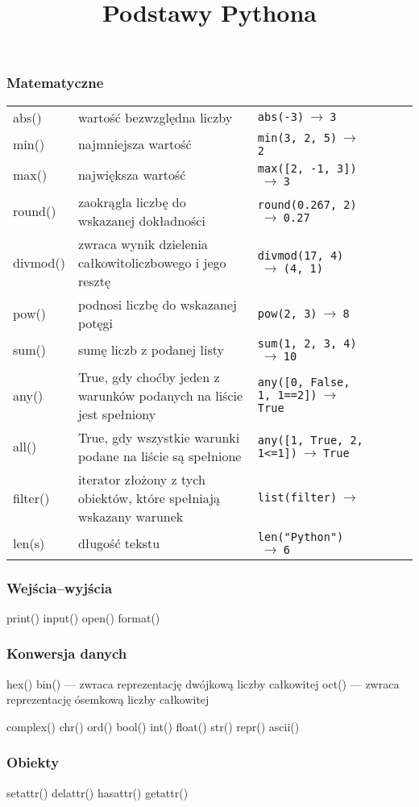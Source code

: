 \documentclass[a4paper]{article}
\title{Podstawy Pythona}
\begin{document}
\subsubsection*{Matematyczne}
\begin{tabularx}{\textwidth}{lp{}|lp{}|lp{}}
abs() & wartość bezwzględna liczby & \verb|abs(-3)|$\ \to\ $\verb|3|\\
min() & najmniejsza wartość & \verb|min(3, 2, 5)|$\ \to\ $\verb|2| \\
max() & największa wartość & \verb|max([2, -1, 3])|$\ \to\ $\verb|3|\\
round() & zaokrągla liczbę do wskazanej dokładności &  \verb|round(0.267, 2)|$\ \to\ $\verb|0.27|\\

divmod() & zwraca wynik dzielenia całkowitoliczbowego i jego resztę & \verb|divmod(17, 4)|$\ \to\ $\verb|(4, 1)|\\
pow() & podnosi liczbę do wskazanej potęgi & \verb|pow(2, 3)|$\ \to\ $\verb|8|\\
sum() & sumę liczb z podanej listy & \verb|sum(1, 2, 3, 4)|$\ \to\ $\verb|10|\\
any() & True, gdy choćby jeden z warunków podanych na liście jest spełniony & \verb|any([0, False, 1, 1==2])|$\ \to\ $\verb|True|\\
all() & True, gdy wszystkie warunki podane na liście są spełnione & \verb|any([1, True, 2, 1<=1])|$\ \to\ $\verb|True|\\
filter() & iterator złożony z tych obiektów, które spełniają wskazany warunek & \verb|list(filter)|$\ \to\ $ \\
len(s) & długość tekstu & \verb|len("Python")|$\ \to\ $\verb|6|
\end{tabularx}

\subsubsection*{Wejścia--wyjścia}
print()
input()
open()
format()

\subsubsection*{Konwersja danych}
hex()
bin() --- zwraca reprezentację dwójkową liczby całkowitej
oct() --- zwraca reprezentację ósemkową liczby całkowitej

complex()
chr()
ord()
bool()
int()
float()
str()
repr()
ascii()

\subsubsection*{Obiekty}
setattr()
delattr()
hasattr()
getattr()
\end{document}
